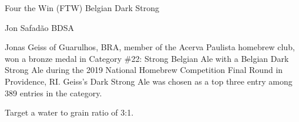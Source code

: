 \begin{recipe}{Four the Win (FTW) Belgian Dark Strong}
\begin{recipe}{Jon Safadão BDSA}

\begin{aboutblock}
Jonas Geiss of Guarulhos, BRA, member of the Acerva Paulista homebrew club, won
a bronze medal in Category \#22: Strong Belgian Ale with a Belgian Dark Strong
Ale during the 2019 National Homebrew Competition Final Round in Providence, RI.
Geiss's Dark Strong Ale was chosen as a top three entry among 389 entries in the
category. \sourceaha
\end{aboutblock}


\begin{methodandtiming}
 
\begin{mashsteps}
\end{mashsteps}

\begin{fermentationsteps}
\end{fermentationsteps}

\begin{directions}
Target a water to grain ratio of 3:1.
\end{directions}

\end{methodandtiming}

\recipebreak

\begin{ingredientsblock}

\begin{malts}
\end{malts}

\begin{hops}
\end{hops}


\end{ingredientsblock}

\end{recipe}

\end{recipe}
